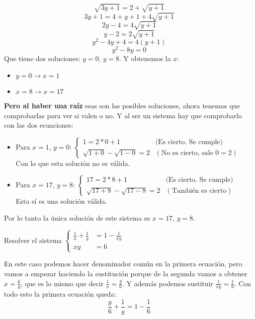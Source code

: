 \documentclass[a4paper,11pt,answers]{exam}
\begin{document}
\begin{questions}
\begin{solution}
      \[\sqrt{3y + 1} = 2+\sqrt{y + 1}\]
      \[3y + 1 = 4 + y + 1 + 4\sqrt{y + 1}\]
      \[2y -4 = 4\sqrt{y + 1}\]
      \[y - 2 = 2\sqrt{y + 1}\]
      \[y^2 - 4y + 4 = 4(y+1)\]
      \[y^2 - 8y = 0\]
      Que tiene dos soluciones: $y= 0$, $y = 8$.
      Y obtenemos la $x$:
      \begin{itemize}
      \item $y=0 \longrightarrow x =1$
      \item $x = 8 \longrightarrow x = 17$
      \end{itemize}
      \textbf{Pero al haber una raíz} esas son las posibles soluciones, ahora tenemos que comprobarlas para ver si
      valen o no. Y al ser un sistema hay que comprobarlo con las dos ecuaciones:
      \begin{itemize}
      \item Para $x=1$, $y=0$: $
        \begin{cases}
          1 = 2*0 + 1& \text{(Es cierto. Se cumple)}\\
          \sqrt{1 + 0} - \sqrt{1 - 0} = 2& (\text{No es cierto, sale } 0=2)
        \end{cases}$\\
        Con lo que esta solución no es válida.
      \item Para $x = 17$, $y = 8$: $
        \begin{cases}
          17 = 2*8 + 1& \text{(Es cierto. Se cumple)}\\
          \sqrt{17 + 8} - \sqrt{17 - 8} = 2& (\text{También es cierto})
        \end{cases}$\\
        Esta sí es una solución válida.
      \end{itemize}
      Por lo tanto la única solución de este sistema es $x = 17$, $y =8$.
    \end{solution}
  \question Resolver el sistema $
    \begin{cases}
      \frac{1}{x} + \frac{1}{y} &= 1 - \frac{1}{xy}\\
      xy &=6
    \end{cases}
    $
    \begin{solution}
      En este caso podemos hacer denominador común en la primera ecuación, pero vamos a empezar haciendo la sustitución
      porque de la segunda vamos a obtener $x=\frac{6}{y}$, que es lo mismo que decir $\frac{1}{x} =\frac{y}{6}$.
      Y además podemos sustituir $\frac{1}{xy} = \frac{1}{6}$. Con todo esto la primera ecuación queda:
      \[\frac{y}{6} + \frac{1}{y} = 1 - \frac{1}{6}\]

\end{solution}
\end{questions}
\end{document}
